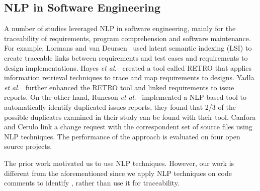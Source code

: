 \subsection{NLP in Software Engineering}

A number of studies leveraged NLP in software engineering, mainly for the traceability of requirements, program comprehension and software maintenance. For example, Lormans and van Deursen~\cite{Lormans2006CSRM} used latent semantic indexing (LSI) to create traceable links between requirements and test cases and requirements to design implementations. Hayes \textit{et al.}~\cite{Hayes2005, Hayes2006TSE} created a tool called RETRO that applies information retrieval techniques to trace and map requirements to designs. Yadla \textit{et al.}~\cite{yadla2005tracing} further enhanced the RETRO tool and linked requirements to issue reports. On the other hand, Runeson \textit{et al.}~\cite{Runeson2007ICSE} implemented a NLP-based tool to automatically identify duplicated issues reports, they found that 2/3 of the possible duplicates examined in their study can be found with their tool. Canfora and Cerulo \cite{Canfora2005ISSM} link a change request with the correspondent set of source files using NLP techniques. The performance of the approach is evaluated on four open source projects.  

The prior work motivated us to use NLP techniques. However, our work is different from the aforementioned since we apply NLP techniques on code comments to identify \SATD, rather than use it for traceability.